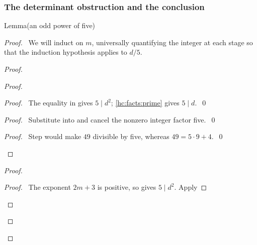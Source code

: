 \begin{mergedproofsection}
\subsubsection{The determinant obstruction and the conclusion}

\begin{namedresult}{Lemma}{(an odd power of five)}\label{hc:lem:odd-power}
 \leavevmode\par
\end{namedresult}
\begin{proof}
 \pfsketch\ We will induct on $m$, universally quantifying the
 integer at each stage so that the induction hypothesis applies to $d/5$.
 \begin{proof}
  \begin{proof}
   \begin{proof}\pf\ The equality in  gives $5\mid d^2$;
    \ref{hc:facts:prime} gives $5\mid d$.~\qed\end{proof}
   \begin{proof}\pf\ Substitute  into
     and cancel the nonzero integer factor five.~\qed\end{proof}
   \qedstep
   \begin{proof}\pf\ Step  would make
    $49$ divisible by five, whereas $49=5\cdot9+4$.~\qed\end{proof}
  \end{proof}
  \begin{proof}
   \begin{proof}\pf\ The exponent $2m+3$ is positive, so
     gives $5\mid d^2$. Apply

\end{proof}
\end{proof}
\end{proof}
\end{proof}
\end{mergedproofsection}
